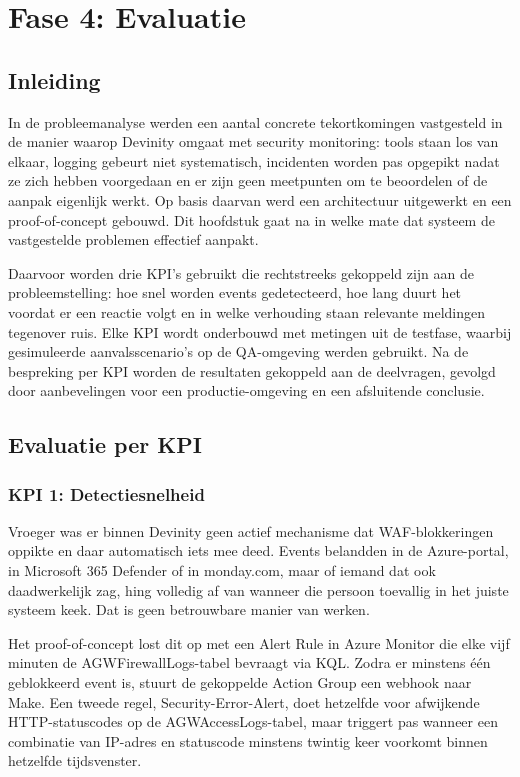 \chapter{Fase 4: Evaluatie}
\label{ch:evaluatie}

\section{Inleiding}

In de probleemanalyse werden een aantal concrete tekortkomingen vastgesteld in de manier waarop Devinity omgaat met security monitoring: tools staan los van elkaar, logging gebeurt niet systematisch, incidenten worden pas opgepikt nadat ze zich hebben voorgedaan en er zijn geen meetpunten om te beoordelen of de aanpak eigenlijk werkt. Op basis daarvan werd een architectuur uitgewerkt en een proof-of-concept gebouwd. Dit hoofdstuk gaat na in welke mate dat systeem de vastgestelde problemen effectief aanpakt.

Daarvoor worden drie KPI's gebruikt die rechtstreeks gekoppeld zijn aan de probleemstelling: hoe snel worden events gedetecteerd, hoe lang duurt het voordat er een reactie volgt en in welke verhouding staan relevante meldingen tegenover ruis. Elke KPI wordt onderbouwd met metingen uit de testfase, waarbij gesimuleerde aanvalsscenario's op de QA-omgeving werden gebruikt. Na de bespreking per KPI worden de resultaten gekoppeld aan de deelvragen, gevolgd door aanbevelingen voor een productie-omgeving en een afsluitende conclusie.

\newpage


\section{Evaluatie per KPI}
\subsection{KPI 1: Detectiesnelheid}
Vroeger was er binnen Devinity geen actief mechanisme dat WAF-blokkeringen oppikte en daar automatisch iets mee deed. Events belandden in de Azure-portal, in Microsoft 365 Defender of in monday.com, maar of iemand dat ook daadwerkelijk zag, hing volledig af van wanneer die persoon toevallig in het juiste systeem keek. Dat is geen betrouwbare manier van werken.

Het proof-of-concept lost dit op met een Alert Rule in Azure Monitor die elke vijf minuten de AGWFirewallLogs-tabel bevraagt via KQL. Zodra er minstens één geblokkeerd event is, stuurt de gekoppelde Action Group een webhook naar Make. Een tweede regel, Security-Error-Alert, doet hetzelfde voor afwijkende HTTP-statuscodes op de AGWAccessLogs-tabel, maar triggert pas wanneer een combinatie van IP-adres en statuscode minstens twintig keer voorkomt binnen hetzelfde tijdsvenster.


